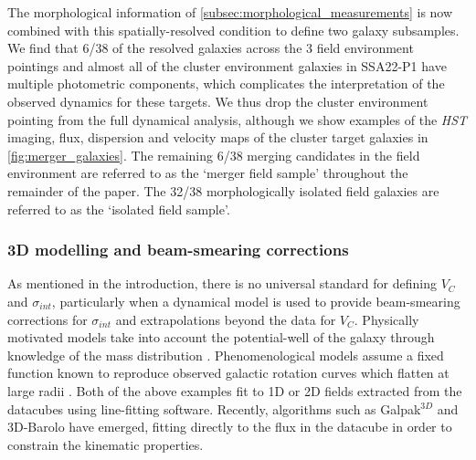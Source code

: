 \documentclass[fleqn,usenatbib]{mn2e}
\begin{document}
The morphological information of \cref{subsec:morphological_measurements} is now combined with this spatially-resolved condition to define two galaxy subsamples.
We find that 6/38 of the resolved galaxies across the 3 field environment pointings and almost all of the cluster environment galaxies in SSA22-P1 have multiple photometric components, which complicates the interpretation of the observed dynamics for these targets.
We thus drop the cluster environment pointing from the full dynamical analysis, although we show examples of the {\em HST} imaging, flux, dispersion and velocity maps of the cluster target galaxies in \cref{fig:merger_galaxies}.
The remaining 6/38 merging candidates in the field environment are referred to as the `merger field sample' throughout the remainder of the paper.
The 32/38 morphologically isolated field galaxies are referred to as the `isolated field sample'.

\subsubsection{3D modelling and beam-smearing corrections}\label{subsec:3d_modelling}

As mentioned in the introduction, there is no universal standard for defining $V_{C}$ and $\sigma_{int}$, particularly when a dynamical model is used to provide beam-smearing corrections for $\sigma_{int}$ and extrapolations beyond the data for $V_{C}$.
Physically motivated models take into account the potential-well of the galaxy through knowledge of the mass distribution \citep[e.g.][]{Genzel2008,ForsterSchreiber2009,Gnerucci2011,Wisnioski2015,Swinbank2017}.
Phenomenological models assume a fixed function known to reproduce observed galactic rotation curves which flatten at large radii \citep[e.g.][]{Epinat2010,Epinat2012,Swinbank2012,Stott2016,Harrison2017}.
Both of the above examples fit to 1D or 2D fields extracted from the datacubes using line-fitting software.
Recently, algorithms such as Galpak$^{3D}$ \citep{Bouche2015} and 3D-Barolo \citep{DiTeodoro2015} have emerged, fitting directly to the flux in the datacube in order to constrain the kinematic properties.
\end{document}
